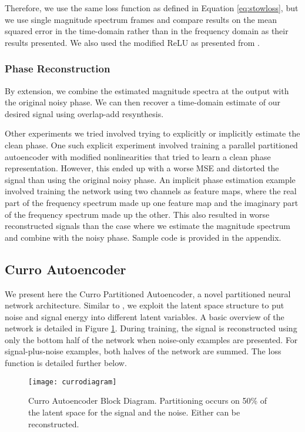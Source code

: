 Therefore, we use the same loss function as defined in Equation \ref{eq:stowloss}, but we use single magnitude spectrum frames and compare results on the mean squared error in the time-domain rather than in the frequency domain as their results presented. We also used the modified ReLU as presented from \cite{liu2014experiments}.

\subsubsection{Phase Reconstruction}

By extension, we combine the estimated magnitude spectra at the output with the original noisy phase. We can then recover a time-domain estimate of our desired signal using overlap-add resynthesis.

Other experiments we tried involved trying to explicitly or implicitly estimate the clean phase. One such explicit experiment involved training a parallel partitioned autoencoder with modified nonlinearities that tried to learn a clean phase representation. However, this ended up with a worse MSE and distorted the signal than using the original noisy phase. An implicit phase estimation example involved training the network using two channels as feature maps, where the real part of the frequency spectrum made up one feature map and the imaginary part of the frequency spectrum made up the other. This also resulted in worse reconstructed signals than the case where we estimate the magnitude spectrum and combine with the noisy phase. Sample code is provided in the appendix.

\subsection{Curro Autoencoder}

We present here the Curro Partitioned Autoencoder, a novel partitioned neural network architecture. Similar to \cite{stow}, we exploit the latent space structure to put noise and signal energy into different latent variables. A basic overview of the network is detailed in Figure \ref{fig:currodiagram}. During training, the signal is reconstructed using only the bottom half of the network when noise-only examples are presented. For signal-plus-noise examples, both halves of the network are summed. The loss function is detailed further below.

\begin{figure}[!ht]
\centering
\texttt{[image: currodiagram]}
\caption[Curro Autoencoder Block Diagram]{Curro Autoencoder Block Diagram. Partitioning occurs on 50\% of the latent space for the signal and the noise. Either can be reconstructed.}
\label{fig:currodiagram}
\end{figure}

